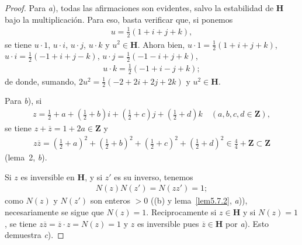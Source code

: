 \documentclass[oneside,bibtotoc,leqno,spanish]{amsbook}
\newcommand{\ZZ}{\mathbf{Z}}
\newcommand{\HH}{\mathbf{H}}
\newcommand{\oline}[1]{\overline{#1}}
\numberwithin{equation}{section}
\theoremstyle{defi}
\theoremstyle{note}
\theoremstyle{rem}
\numberwithin{theorem}{section}
\numberwithin{proposition}{section}
\numberwithin{definition}{section}
\numberwithin{lemma}{section}
\numberwithin{corollary}{section}
\numberwithin{example}{section}
\numberwithin{footnote}{section}%
\begin{document}
\begin{proof}
Para {\itshape a}), todas las afirmaciones son evidentes, salvo la estabilidad de $\HH$ bajo la multiplicaci\'on.
Para eso, basta verificar que, si ponemos
\begin{gather*}
u = \frac{1}{2}(1+i+j+k),
\end{gather*}
se tiene $u\cdot 1$, $u\cdot i$, $u\cdot j$, $u\cdot k$ y $u^{2}\in\HH$. Ahora bien,
$u\cdot 1 = \frac{1}{2}(1+i+j+k)$, $u\cdot i = \frac{1}{2}(-1+i+j-k)$, $u\cdot j=\frac{1}{2}(-1-i+j+k)$,
\begin{gather*}
u\cdot k = \frac{1}{2}(-1+i-j+k);
\end{gather*}
de donde, sumando, $2u^{2}=\frac{1}{2}(-2+2i+2j+2k)$ y $u^{2}\in\HH$.

Para {\itshape b}), si
\begin{gather*}
z = \frac{1}{2}+a+\left(\frac{1}{2}+b\right)i+\left(\frac{1}{2}+c\right)j+\left(\frac{1}{2}+d\right)k
\quad(a,b,c,d\in\ZZ),
\end{gather*}
se tiene $z+\oline z = 1+2a\in\ZZ$ y
\begin{gather*}
z\oline z = \left(\frac{1}{2}+a\right)^{2}+\left(\frac{1}{2}+b\right)^{2}+\left(\frac{1}{2}+c\right)^{2}
+\left(\frac{1}{2}+d\right)^{2}\in\frac{4}{4}+\ZZ\subset\ZZ
\end{gather*}
(lema~2, {\itshape b}).

Si $z$ es inversible en $\HH$, y si $z'$ es su inverso, tenemos
\begin{gather*}
N(z)N(z') = N(zz') = 1;
\end{gather*}
como $N(z)$ y $N(z')$ son enteros $>0$ ((b) y
lema~\ref{lem5.7.2}, {\itshape a})), necesariamente se sigue que
$N(z) = 1$. Reciprocamente si $z\in\HH$ y si $N(z) = 1$, se tiene
$z\oline z = \oline z\cdot z = N(z) = 1$
y $z$ es inversible pues $\oline z\in\HH$ por {\itshape a}). Esto demuestra {\itshape c}).


\end{proof}
\end{document}
